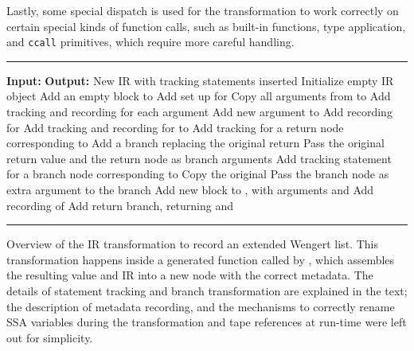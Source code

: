 Lastly, some special dispatch is used for the transformation to work correctly on certain special
kinds of function calls, such as built-in functions, type application, and \texttt{ccall}
primitives, which require more careful handling.

\begin{algorithm}[p]
  \footnotesize
  \hrule
  \smallskip
  \begin{algorithmic}
    \State \textbf{Input:} 
    \State \textbf{Output:} New IR with tracking statements inserted
    \Statex
    \State Initialize empty IR object 
    \Statex
    \State Add an empty block  to 
    \State Add set up for 
    \EndIf
    \Statex
    \State Copy all arguments from  to 
    \State Add tracking and recording for each argument
    \Statex
    \State Add new argument  to 
    \State Add recording for 
    \EndIf
    \Statex
    \State Add tracking and recording for  to 
    \EndFor
    \Statex
    \State Add tracking for a return node corresponding to 
    \State Add a branch replacing the original return
    \State Pass the original return value and the return node as branch arguments
    \Else
    \State Add tracking statement for a branch node corresponding to 
    \State Copy the original 
    \State Pass the branch node as extra argument to the branch
    \EndIf
    \EndFor
    \EndFor
    \Statex
    \State Add new block to , with  arguments  and 
    \State Add recording of 
    \State Add return branch, returning  and 
  \end{algorithmic}
  \smallskip
  \hrule
  \caption[IR transformation to record an extended Wengert list]{Overview of the IR transformation
    to record an extended Wengert list.  This transformation happens inside a generated function
    called by \protect{}, which assembles the resulting value and IR into a new node
    with the correct metadata.  The details of statement tracking and branch transformation are
    explained in the text; the description of metadata recording, and the mechanisms to correctly
    rename SSA variables during the transformation and tape references at run-time were left out for
    simplicity.\label{alg:ir-transform}}
\end{algorithm}

